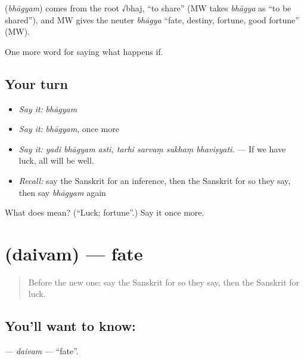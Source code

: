 \begin{cousinweb}
\textbf{} (\emph{bhāgyam}) comes from the root √bhaj, \textquotedblleft{}to share\textquotedblright{} (MW takes \emph{bhāgya} as \textquotedblleft{}to be shared\textquotedblright{}), and MW gives the neuter \emph{bhāgya} \textquotedblleft{}fate, destiny, fortune, good fortune\textquotedblright{} (MW).
\end{cousinweb}

\begin{grammarlens}[title={What you've built}]
One more word for saying what happens if.
\end{grammarlens}

\subsection*{Your turn}
\begin{itemize}
\raggedright
  \item \emph{Say it:} \emph{bhāgyam}
  \item \emph{Say it:} \emph{bhāgyam}, once more
  \item \emph{Say it:} \emph{yadi bhāgyam asti, tarhi sarvaṃ sukhaṃ bhaviṣyati.} — If we have luck, all will be well.
  \item \emph{Recall:} say the Sanskrit for an inference, then the Sanskrit for so they say, then say \emph{bhāgyam} again
\end{itemize}

\begin{tcolorbox}[breakable,colback=teal!4,colframe=teal!35!black,title={Before you move on}]
What does  mean? (\textquotedblleft{}Luck; fortune\textquotedblright{}.) Say it once more.
\end{tcolorbox}
\section[\texorpdfstring{\sk{दैवम्} (daivam)}{दैवम् (daivam)}]{ (daivam) — fate}

\label{lesson:SA-C369-daivam}



\begin{quote}
Before the new one: say the Sanskrit for so they say, then the Sanskrit for luck.
\end{quote}

\subsection*{You'll want to know: }
\textbf{} — \emph{daivam} — \textquotedblleft{}fate\textquotedblright{}.

